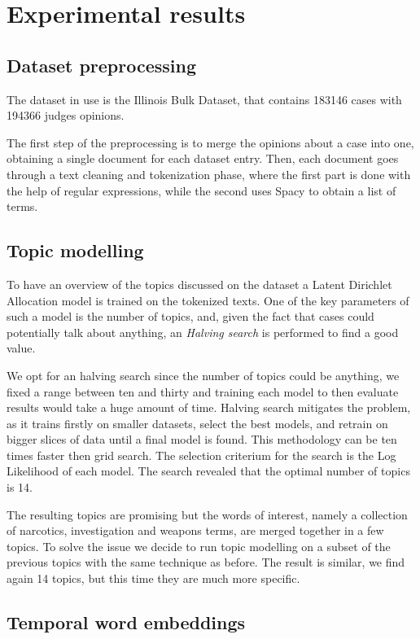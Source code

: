 \section{Experimental results}

\subsection{Dataset preprocessing}
The dataset in use is the Illinois Bulk Dataset, that contains 
183146 cases with 194366 judges opinions. 

The first step of the preprocessing is to merge the opinions about a 
case into one, obtaining a single document for each dataset entry.  
Then, each document goes through a text cleaning and tokenization phase, 
where the first part is done with the help of regular expressions, 
while the second uses Spacy to obtain a list of terms.

\subsection{Topic modelling}
To have an overview of the topics discussed on the dataset a Latent 
Dirichlet Allocation model is trained on the tokenized texts.
One of the key parameters of such a model is the number of topics, and, 
given the fact that cases could potentially talk about anything, an 
\emph{Halving search} is performed to find a good value.~\cite{halving-search}

We opt for an halving search since the number of topics could be anything, 
we fixed a range between ten and thirty and training each model 
to then evaluate results would take a huge amount of time. Halving search 
mitigates the problem, as it trains firstly on smaller datasets, select 
the best models, and retrain on bigger slices of data until a final model 
is found. This methodology can be ten times faster then grid search. 
The selection criterium for the search is the Log Likelihood of each model.
The search revealed that the optimal number of topics is 14.

The resulting topics are promising but the words of interest, namely a collection 
of narcotics, investigation and weapons terms, are merged together in a few topics. 
To solve the issue we decide to run topic modelling on a subset of the previous 
topics with the same technique as before. The result is similar, we find again 14 topics, 
but this time they are much more specific.

\subsection{Temporal word embeddings}

